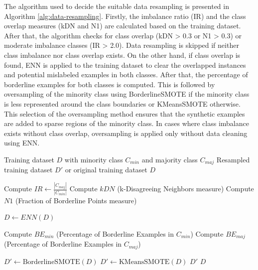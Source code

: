 The algorithm used to decide the suitable data resampling is presented in Algorithm \ref{alg:data-resampling}. Firstly, the imbalance ratio (\acrshort{IR}) and the class overlap measures (kDN and N1) are calculated based on the training dataset. After that, the algorithm checks for class overlap (kDN > 0.3 or N1 > 0.3) or moderate imbalance classes (IR > 2.0). Data resampling is skipped if neither class imbalance nor class overlap exists. On the other hand, if class overlap is found, ENN is applied to the training dataset to clear the overlapped instances and potential mislabeled examples in both classes. After that, the percentage of borderline examples for both classes is computed. This is followed by oversampling of the minority class using BorderlineSMOTE if the minority class is less represented around the class boundaries or KMeansSMOTE otherwise. This selection of the oversampling method ensures that the synthetic examples are added to sparse regions of the minority class. In cases where class imbalance exists without class overlap, oversampling is applied only without data cleaning using ENN.

\captionsetup[algorithm]{list=no}
\begin{algorithm}
\caption{Data Resampling Decision Algorithm}
\label{alg:data-resampling}
\begin{algorithmic}[1]
    \Require Training dataset $D$ with minority class $C_{min}$ and majority class $C_{maj}$
    \Ensure Resampled training dataset $D'$ or original training dataset $D$
    
    \State Compute $IR \leftarrow \frac{|C_{maj}|}{|C_{min}|}$
    \State Compute $kDN$ (k-Disagreeing Neighbors measure)
    \State Compute $N1$ (Fraction of Borderline Points measure)
    
            \State $D \leftarrow ENN(D)$
        \EndIf

        \State Compute $BE_{min}$ (Percentage of Borderline Examples in $C_{min}$)
        \State Compute $BE_{maj}$ (Percentage of Borderline Examples in $C_{maj}$)
    
            \State $D' \leftarrow \text{BorderlineSMOTE}(D)$
        \Else
            \State $D' \leftarrow \text{KMeansSMOTE}(D)$
        \EndIf
        \State \Return $D'$
    \Else
        \State \Return $D$
    \EndIf
\end{algorithmic}
\end{algorithm}

